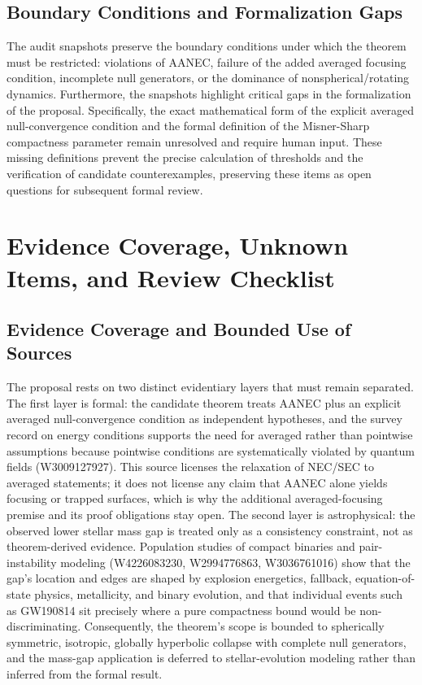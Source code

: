 \documentclass[conference]{IEEEtran}
\begin{document}
\subsection{Boundary Conditions and Formalization Gaps}
The audit snapshots preserve the boundary conditions under which the theorem must be restricted: violations of AANEC, failure of the added averaged focusing condition, incomplete null generators, or the dominance of nonspherical/rotating dynamics. Furthermore, the snapshots highlight critical gaps in the formalization of the proposal. Specifically, the exact mathematical form of the explicit averaged null-convergence condition and the formal definition of the Misner-Sharp compactness parameter remain unresolved and require human input. These missing definitions prevent the precise calculation of thresholds and the verification of candidate counterexamples, preserving these items as open questions for subsequent formal review.

\section{Evidence Coverage, Unknown Items, and Review Checklist}
\subsection{Evidence Coverage and Bounded Use of Sources}
The proposal rests on two distinct evidentiary layers that must remain separated. The first layer is formal: the candidate theorem treats AANEC plus an explicit averaged null-convergence condition as independent hypotheses, and the survey record on energy conditions supports the need for averaged rather than pointwise assumptions because pointwise conditions are systematically violated by quantum fields (W3009127927). This source licenses the relaxation of NEC/SEC to averaged statements; it does not license any claim that AANEC alone yields focusing or trapped surfaces, which is why the additional averaged-focusing premise and its proof obligations stay open. The second layer is astrophysical: the observed lower stellar mass gap is treated only as a consistency constraint, not as theorem-derived evidence. Population studies of compact binaries and pair-instability modeling (W4226083230, W2994776863, W3036761016) show that the gap's location and edges are shaped by explosion energetics, fallback, equation-of-state physics, metallicity, and binary evolution, and that individual events such as GW190814 sit precisely where a pure compactness bound would be non-discriminating. Consequently, the theorem's scope is bounded to spherically symmetric, isotropic, globally hyperbolic collapse with complete null generators, and the mass-gap application is deferred to stellar-evolution modeling rather than inferred from the formal result.~\cite{cite_0ed84243cf171bc4,cite_7a407c865faafd11,cite_f634820e22d7a238,cite_fd0f77b2a173c0ab}
\end{document}

